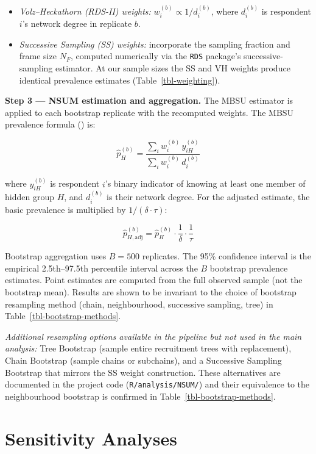 \documentclass[
  12pt,
  letterpaper,
  DIV=11,
  numbers=noendperiod]{scrreprt}
\providecommand{\tightlist}{%
  \setlength{\itemsep}{0pt}\setlength{\parskip}{0pt}}
\begin{document}
\begin{itemize}
\tightlist
\item
  \emph{Volz--Heckathorn (RDS-II) weights:}
  \(w_i^{(b)} \propto 1/d_i^{(b)}\), where \(d_i^{(b)}\) is respondent
  \(i\)'s network degree in replicate \(b\).
\item
  \emph{Successive Sampling (SS) weights:} incorporate the sampling
  fraction and frame size \(N_F\), computed numerically via the
  \texttt{RDS} package's successive-sampling estimator. At our sample
  sizes the SS and VH weights produce identical prevalence estimates
  (Table~\ref{tbl-weighting}).
\end{itemize}

\textbf{Step 3 --- NSUM estimation and aggregation.} The MBSU estimator
is applied to each bootstrap replicate with the recomputed weights. The
MBSU prevalence formula () is:

\[\hat{p}_H^{(b)} = \frac{\sum_i w_i^{(b)} \, y_{iH}^{(b)}}{\sum_i w_i^{(b)} \, d_i^{(b)}}\]

where \(y_{iH}^{(b)}\) is respondent \(i\)'s binary indicator of knowing
at least one member of hidden group \(H\), and \(d_i^{(b)}\) is their
network degree. For the adjusted estimate, the basic prevalence is
multiplied by \(1/(\delta \cdot \tau)\):

\[\hat{p}_{H,\text{adj}}^{(b)} = \hat{p}_H^{(b)} \cdot \frac{1}{\delta} \cdot \frac{1}{\tau}\]

Bootstrap aggregation uses \(B = 500\) replicates. The 95\% confidence
interval is the empirical 2.5th--97.5th percentile interval across the
\(B\) bootstrap prevalence estimates. Point estimates are computed from
the full observed sample (not the bootstrap mean). Results are shown to
be invariant to the choice of bootstrap resampling method (chain,
neighbourhood, successive sampling, tree) in
Table~\ref{tbl-bootstrap-methods}.

\emph{Additional resampling options available in the pipeline but not
used in the main analysis:} Tree Bootstrap (sample entire recruitment
trees with replacement), Chain Bootstrap (sample chains or subchains),
and a Successive Sampling Bootstrap that mirrors the SS weight
construction. These alternatives are documented in the project code
(\texttt{R/analysis/NSUM/}) and their equivalence to the neighbourhood
bootstrap is confirmed in Table~\ref{tbl-bootstrap-methods}.

\chapter{Sensitivity Analyses}\label{sec-d}
\end{document}
